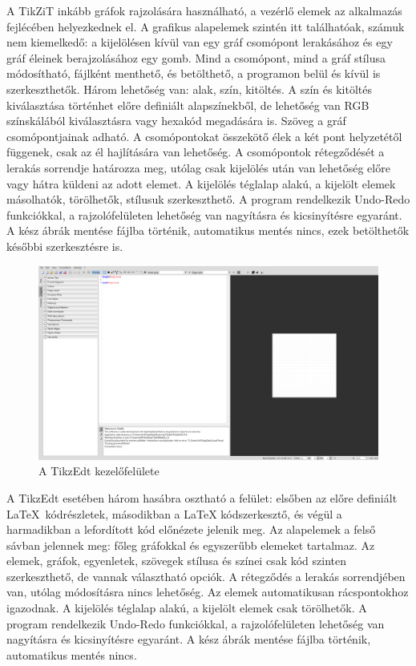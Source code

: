 \noindent
A TikZiT inkább gráfok rajzolására használható, a vezérlő elemek az alkalmazás fejlécében helyezkednek el. A grafikus alapelemek szintén itt találhatóak, számuk nem kiemelkedő: a kijelölésen kívül van egy gráf csomópont lerakásához és egy gráf éleinek berajzolásához egy gomb. Mind a csomópont, mind a gráf stílusa módosítható, fájlként menthető, és betölthető, a programon belül és kívül is szerkeszthetők. Három lehetőség van: alak, szín, kitöltés. A szín és kitöltés kiválasztása történhet előre definiált alapszínekből, de lehetőség van RGB színskálából kiválasztásra vagy hexakód megadására is. Szöveg a gráf csomópontjainak adható. A csomópontokat összekötő élek a két pont helyzetétől függenek, csak az él hajlítására van lehetőség. A csomópontok rétegződését a lerakás sorrendje határozza meg, utólag csak kijelölés után van lehetőség előre vagy hátra küldeni az adott elemet. A kijelölés téglalap alakú, a kijelölt elemek másolhatók, törölhetők, stílusuk szerkeszthető.  A program rendelkezik Undo-Redo funkciókkal, a rajzolófelületen lehetőség van nagyításra és kicsinyítésre egyaránt. A kész ábrák mentése fájlba történik, automatikus mentés nincs, ezek betölthetők későbbi szerkesztésre is. 

\begin{figure}[!h]
	\includegraphics[width=\textwidth]{images/tikzedt.png}
	\caption{A TikzEdt kezelőfelülete \cite{tikzedt}}
\label{fig:tikzedt}
\end{figure}

\noindent
A TikzEdt esetében három hasábra osztható a felület: elsőben az előre definiált \LaTeX\ kódrészletek, másodikban a LaTeX kódszerkesztő, és végül a harmadikban a lefordított kód előnézete jelenik meg. Az alapelemek a felső sávban jelennek meg: főleg gráfokkal és egyszerűbb elemeket tartalmaz. Az elemek, gráfok, egyenletek, szövegek stílusa és színei csak kód szinten szerkeszthető, de vannak választható opciók. A rétegződés a lerakás sorrendjében van, utólag módosításra nincs lehetőség. Az elemek automatikusan rácspontokhoz igazodnak. A kijelölés téglalap alakú, a kijelölt elemek csak törölhetők.  A program rendelkezik Undo-Redo funkciókkal, a rajzolófelületen lehetőség van nagyításra és kicsinyítésre egyaránt. A kész ábrák mentése fájlba történik, automatikus mentés nincs.

